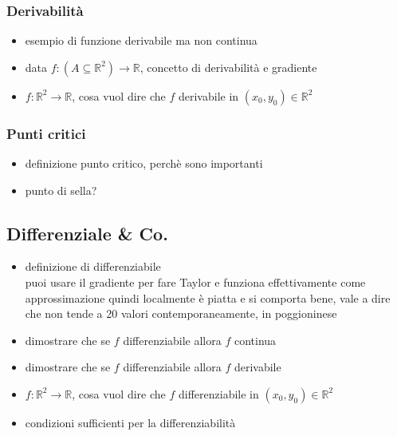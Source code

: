 \documentclass[11pt]{article}
\begin{document}
\subsubsection{Derivabilità}
\label{sec:org6cf59ce}
\begin{itemize}
\item esempio di funzione derivabile ma non continua
\item data \(f : (A \subseteq \mathbb{R}^2) \to \mathbb{R}\), concetto di derivabilità e gradiente
\item \(f : \mathbb{R}^2 \to \mathbb{R}\), cosa vuol dire che \(f\) derivabile in
\((x_0, y_0) \in \mathbb{R}^2\)
\end{itemize}

\subsubsection{Punti critici}
\label{sec:org6293bfd}
\begin{itemize}
\item definizione punto critico, perchè sono importanti
\item punto di sella?
\end{itemize}

\subsection{Differenziale \& Co.}
\label{sec:orgc4a994b}
\begin{itemize}
\item definizione di differenziabile \\
puoi usare il gradiente per fare Taylor e funziona effettivamente come approssimazione
quindi localmente è piatta e si comporta bene, vale a dire che non tende a 20 valori
contemporaneamente, in poggioninese
\end{itemize}


\begin{itemize}
\item dimostrare che se \(f\) differenziabile allora \(f\) continua
\item dimostrare che se \(f\) differenziabile allora \(f\) derivabile
\item \(f : \mathbb{R}^2 \to \mathbb{R}\), cosa vuol dire che \(f\) differenziabile in
\((x_0, y_0) \in \mathbb{R}^2\)
\item condizioni sufficienti per la differenziabilità
\end{itemize}
\end{document}
